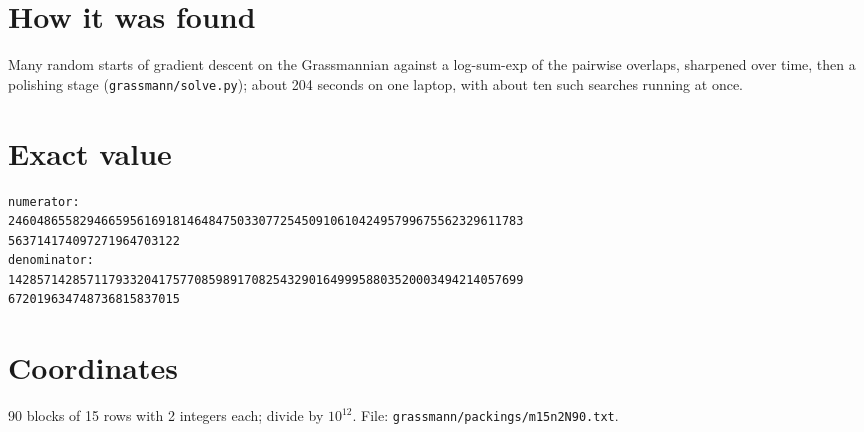 \documentclass[11pt,a4paper]{article}
\begin{document}
\section{How it was found}
Many random starts of gradient descent on the Grassmannian against a log-sum-exp of the pairwise overlaps, sharpened over time, then a polishing stage (\texttt{grassmann/solve.py}); about 204 seconds on one laptop, with about ten such searches running at once.


\appendix
\section{Exact value}
{\small
\begin{verbatim}
numerator:
246048655829466595616918146484750330772545091061042495799675562329611783
563714174097271964703122
denominator:
142857142857117933204175770859891708254329016499958803520003494214057699
672019634748736815837015
\end{verbatim}}

\section{Coordinates}
90 blocks of 15 rows with 2 integers each; divide by $10^{12}$. File: \texttt{grassmann/packings/m15n2N90.txt}.
{\tiny
\begin{multicols}{4}
\end{multicols}}
\end{document}
